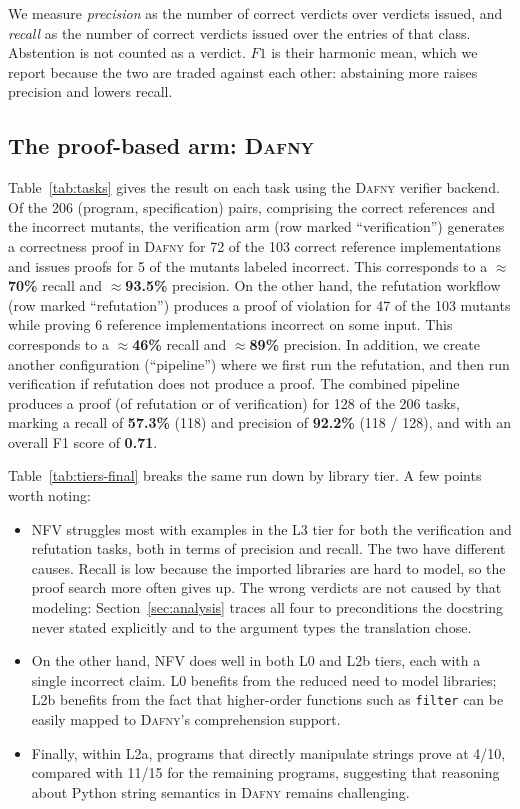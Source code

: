 \documentclass[11pt,letterpaper]{article}
\newcommand{\daf}{\textsc{Dafny}}
\begin{document}
We measure \emph{precision} as the number of correct verdicts over verdicts
issued, and \emph{recall} as the number of correct verdicts issued over the entries of that class.
Abstention is not counted as a verdict.
$F1$ is their harmonic mean, which we report because the two are traded against
each other: abstaining more raises precision and lowers recall.






\subsection{The proof-based arm: \daf{}}
\label{sec:evalverify}

Table~\ref{tab:tasks} gives the result on each task using the \daf{} verifier backend.
Of the 206 (program, specification) pairs, comprising the correct references and the incorrect mutants, the 
verification arm (row marked ``verification'') generates a correctness proof in \daf{} for 72 of the 103 correct reference implementations and issues proofs for 5 of the mutants labeled incorrect.
This corresponds to a $\approx$\textbf{70\%} recall and $\approx$\textbf{93.5\%} precision.
On the other hand, the refutation workflow (row marked ``refutation'') produces a proof of violation for 47 of the 103 mutants while proving 6 reference implementations incorrect on some input.
This corresponds to a $\approx$\textbf{46\%} recall and $\approx$\textbf{89\%} precision.
In addition, we create another configuration (``pipeline'') where we first run the refutation, and then run verification if refutation does not produce a proof.
The combined pipeline produces a proof (of refutation or of verification) for 128 of the 206 tasks, marking a recall of \textbf{57.3\%} (118) and precision of \textbf{92.2\%} (118 / 128), 
and with an overall F1 score of \textbf{0.71}.

Table~\ref{tab:tiers-final} breaks the same run down by library tier.
A few points worth noting:
\begin{itemize}
  \item NFV struggles most with examples in the L3 tier for both the verification and refutation tasks, both in terms of precision and recall.
  The two have different causes.
  Recall is low because the imported libraries are hard to model, so the proof search more often gives up.
  The wrong verdicts are not caused by that modeling: Section~\ref{sec:analysis} traces all four to preconditions the 
  docstring never stated explicitly and to the argument types the translation chose.
  \item On the other hand, NFV does well in both L0 and L2b tiers, each with a single incorrect claim.
  L0 benefits from the reduced need to model libraries; 
  L2b benefits from the fact that higher-order functions such as \texttt{filter} can be easily mapped to \daf{}'s comprehension support.
  \item Finally, within L2a, programs that directly manipulate strings prove at
  4/10, compared with 11/15 for the remaining programs, suggesting that
  reasoning about Python string semantics in \daf{} remains challenging.
\end{itemize}
\end{document}
